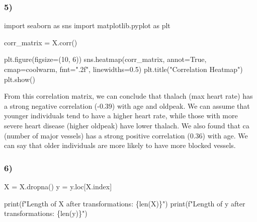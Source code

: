 \documentclass[
  11pt,
  letterpaper,
  DIV=11,
  numbers=noendperiod]{scrartcl}
\newenvironment{Shaded}{\begin{snugshade}}{\end{snugshade}}
\newcommand{\BuiltInTok}[1]{\textcolor[rgb]{0.00,0.23,0.31}{#1}}
\newcommand{\DecValTok}[1]{\textcolor[rgb]{0.68,0.00,0.00}{#1}}
\newcommand{\FloatTok}[1]{\textcolor[rgb]{0.68,0.00,0.00}{#1}}
\newcommand{\ImportTok}[1]{\textcolor[rgb]{0.00,0.46,0.62}{#1}}
\newcommand{\NormalTok}[1]{\textcolor[rgb]{0.00,0.23,0.31}{#1}}
\newcommand{\OperatorTok}[1]{\textcolor[rgb]{0.37,0.37,0.37}{#1}}
\newcommand{\SpecialCharTok}[1]{\textcolor[rgb]{0.37,0.37,0.37}{#1}}
\newcommand{\SpecialStringTok}[1]{\textcolor[rgb]{0.13,0.47,0.30}{#1}}
\newcommand{\StringTok}[1]{\textcolor[rgb]{0.13,0.47,0.30}{#1}}
\newcommand{\VariableTok}[1]{\textcolor[rgb]{0.07,0.07,0.07}{#1}}
\begin{document}
\subsubsection{5)}\label{section-4}

\begin{Shaded}
\begin{Highlighting}[]
\ImportTok{import}\NormalTok{ seaborn }\ImportTok{as}\NormalTok{ sns}
\ImportTok{import}\NormalTok{ matplotlib.pyplot }\ImportTok{as}\NormalTok{ plt}

\NormalTok{corr\_matrix }\OperatorTok{=}\NormalTok{ X.corr()}

\NormalTok{plt.figure(figsize}\OperatorTok{=}\NormalTok{(}\DecValTok{10}\NormalTok{, }\DecValTok{6}\NormalTok{))}
\NormalTok{sns.heatmap(corr\_matrix, annot}\OperatorTok{=}\VariableTok{True}\NormalTok{, cmap}\OperatorTok{=}\StringTok{\textquotesingle{}coolwarm\textquotesingle{}}\NormalTok{, fmt}\OperatorTok{=}\StringTok{".2f"}\NormalTok{, linewidths}\OperatorTok{=}\FloatTok{0.5}\NormalTok{)}
\NormalTok{plt.title(}\StringTok{"Correlation Heatmap"}\NormalTok{)}
\NormalTok{plt.show()}
\end{Highlighting}
\end{Shaded}

From this correlation matrix, we can conclude that thalach (max heart
rate) has a strong negative correlation (-0.39) with age and oldpeak. We
can assume that younger individuals tend to have a higher heart rate,
while those with more severe heart disease (higher oldpeak) have lower
thalach. We also found that ca (number of major vessels) has a strong
positive correlation (0.36) with age. We can say that older individuals
are more likely to have more blocked vessels.

\subsubsection{6)}\label{section-5}

\begin{Shaded}
\begin{Highlighting}[]
\NormalTok{X }\OperatorTok{=}\NormalTok{ X.dropna()}
\NormalTok{y }\OperatorTok{=}\NormalTok{ y.loc[X.index]}

\BuiltInTok{print}\NormalTok{(}\SpecialStringTok{f"Length of X after transformations: }\SpecialCharTok{\{}\BuiltInTok{len}\NormalTok{(X)}\SpecialCharTok{\}}\SpecialStringTok{"}\NormalTok{)}
\BuiltInTok{print}\NormalTok{(}\SpecialStringTok{f"Length of y after transformations: }\SpecialCharTok{\{}\BuiltInTok{len}\NormalTok{(y)}\SpecialCharTok{\}}\SpecialStringTok{"}\NormalTok{)}
\end{Highlighting}
\end{Shaded}
\end{document}
